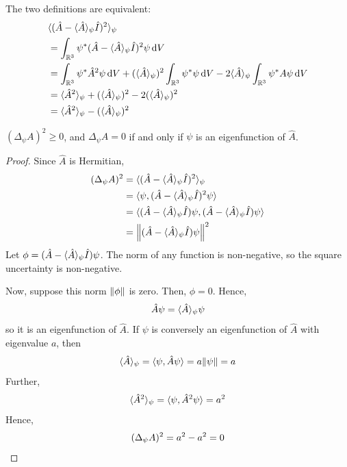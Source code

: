 \documentclass[a4paper]{article}
\begin{document}
The two definitions are equivalent:
\begin{align*}
&\langle{(\hat A - \langle{\hat A}\rangle_\psi \hat I)^2}\rangle_\psi\\ 
 & = \int_{\mathbb R^3} \psi^* (\hat A - \langle{\hat A}\rangle_\psi \hat I)^2 \psi \dd{V}                                                                                                          \\
& = \int_{\mathbb R^3} \psi^* \hat A^2 \psi \dd{V} + (\langle{\hat A}\rangle_\psi)^2 \int_{\mathbb R^3} \psi^* \psi \dd{V} - 2 \langle{\hat A}\rangle_\psi \int_{\mathbb R^3} \psi^* A \psi \dd{V} \\
& = \langle{\hat A^2}\rangle_{\psi} + (\langle{\hat A}\rangle_{\psi})^2 - 2(\langle{\hat A}\rangle_\psi)^2                                                                                                         \\
& = \langle{\hat A^2}\rangle_{\psi} - (\langle{\hat A}\rangle_{\psi})^2
\end{align*}

\begin{lemma}
	\( (\Delta_\psi A)^2 \geq 0 \), and \( \Delta_\psi A = 0 \) if and only if \( \psi \) is an eigenfunction of \( \hat A \).
\end{lemma}
\begin{proof}
	Since \( \hat A \) is Hermitian,
	\begin{align*}
		(\Delta_\psi A)^2 & = \langle{(\hat A - \langle{\hat A}\rangle_\psi \hat I)^2}\rangle_\psi                                              \\
		                  & = \langle{\psi, (\hat A - \langle{\hat A}\rangle_\psi \hat I)^2 \psi}\rangle                                        \\
		                  & = \langle{(\hat A - \langle{\hat A}\rangle_\psi \hat I)\psi, (\hat A - \langle{\hat A}\rangle_\psi \hat I) \psi}\rangle \\
		                  & = \norm{(\hat A - \langle{\hat A}\rangle_\psi \hat I)\psi}^2
	\end{align*}
	Let \( \phi = (\hat A - \langle{\hat A}\rangle_\psi \hat I)\psi \).
	The norm of any function is non-negative, so the square uncertainty is non-negative.

	Now, suppose this norm \( \norm{\phi} \) is zero.
	Then, \( \phi = 0 \).
	Hence,
	\[
		\hat A \psi = \langle{\hat A}\rangle_\psi \psi
	\]
	so it is an eigenfunction of \( \hat A \).
	If \( \psi \) is conversely an eigenfunction of \( \hat A \) with eigenvalue \( a \), then
	\[
		\langle{\hat A}\rangle_\psi = \langle{\psi, \hat A \psi}\rangle = a \norm{\psi} = a
	\]
	Further,
	\[
		\langle{\hat A^2}\rangle_\psi = \langle{\psi, \hat A^2 \psi}\rangle = a^2
	\]
	Hence,
	\[
		(\Delta_\psi A)^2 = a^2 - a^2 = 0\qedhere
	\]
\end{proof}
\end{document}
